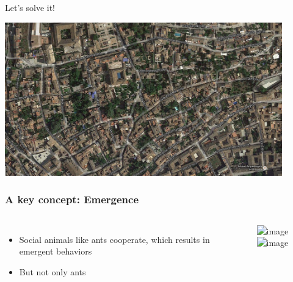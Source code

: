 \begin{frame}{Let's solve it!}

\begin{center} 
   \includegraphics[width=0.9\textwidth]{images/albayzin.png} 
\end{center} 


\end{frame}


\begin{frame}
\frametitle{A key concept: Emergence}
\begin{columns}
 \begin{itemize}
  \item Social animals like ants cooperate, which results in emergent behaviors
  \item<2-> But not only ants
 \end{itemize}
\includegraphics<1>[width=4cm]{images/al-Khwarizmi.png}
\includegraphics<2->[width=5cm]{images/geiser.png}
\end{columns}
\end{frame}
